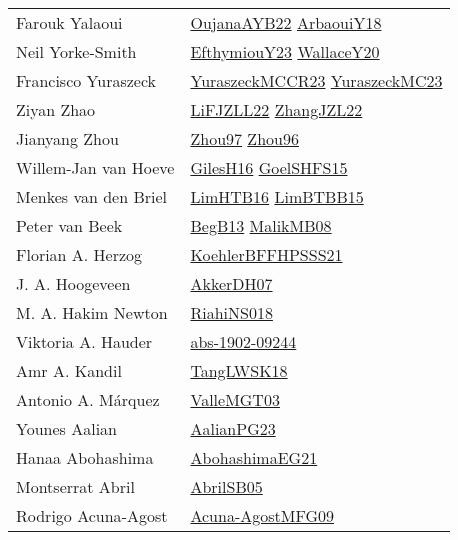 {\begin{longtable}{p{4cm}p{20cm}}
Farouk Yalaoui & \href{papers/OujanaAYB22.pdf}{OujanaAYB22}\cite{OujanaAYB22} \href{papers/ArbaouiY18.pdf}{ArbaouiY18}\cite{ArbaouiY18} \\
Neil Yorke{-}Smith & \href{papers/EfthymiouY23.pdf}{EfthymiouY23}\cite{EfthymiouY23} \href{articles/WallaceY20.pdf}{WallaceY20}\cite{WallaceY20} \\
Francisco Yuraszeck & \href{articles/YuraszeckMCCR23.pdf}{YuraszeckMCCR23}\cite{YuraszeckMCCR23} \href{papers/YuraszeckMC23.pdf}{YuraszeckMC23}\cite{YuraszeckMC23} \\
Ziyan Zhao & \href{papers/LiFJZLL22.pdf}{LiFJZLL22}\cite{LiFJZLL22} \href{papers/ZhangJZL22.pdf}{ZhangJZL22}\cite{ZhangJZL22} \\
Jianyang Zhou & \href{articles/Zhou97.pdf}{Zhou97}\cite{Zhou97} \href{papers/Zhou96.pdf}{Zhou96}\cite{Zhou96} \\
Willem{-}Jan van Hoeve & \href{papers/GilesH16.pdf}{GilesH16}\cite{GilesH16} \href{articles/GoelSHFS15.pdf}{GoelSHFS15}\cite{GoelSHFS15} \\
Menkes van den Briel & \href{papers/LimHTB16.pdf}{LimHTB16}\cite{LimHTB16} \href{papers/LimBTBB15.pdf}{LimBTBB15}\cite{LimBTBB15} \\
Peter van Beek & \href{articles/BegB13.pdf}{BegB13}\cite{BegB13} \href{articles/MalikMB08.pdf}{MalikMB08}\cite{MalikMB08} \\
Florian A. Herzog & \href{articles/KoehlerBFFHPSSS21.pdf}{KoehlerBFFHPSSS21}\cite{KoehlerBFFHPSSS21} \\
J. A. Hoogeveen & \href{papers/AkkerDH07.pdf}{AkkerDH07}\cite{AkkerDH07} \\
M. A. Hakim Newton & \href{papers/RiahiNS018.pdf}{RiahiNS018}\cite{RiahiNS018} \\
Viktoria A. Hauder & \href{articles/abs-1902-09244.pdf}{abs-1902-09244}\cite{abs-1902-09244} \\
Amr A. Kandil & \href{articles/TangLWSK18.pdf}{TangLWSK18}\cite{TangLWSK18} \\
Antonio A. M{\'{a}}rquez & \href{papers/ValleMGT03.pdf}{ValleMGT03}\cite{ValleMGT03} \\
Younes Aalian & \href{papers/AalianPG23.pdf}{AalianPG23}\cite{AalianPG23} \\
Hanaa Abohashima & \href{articles/AbohashimaEG21.pdf}{AbohashimaEG21}\cite{AbohashimaEG21} \\
Montserrat Abril & \href{papers/AbrilSB05.pdf}{AbrilSB05}\cite{AbrilSB05} \\
Rodrigo Acuna{-}Agost & \href{papers/Acuna-AgostMFG09.pdf}{Acuna-AgostMFG09}\cite{Acuna-AgostMFG09} \\

\end{longtable}}
